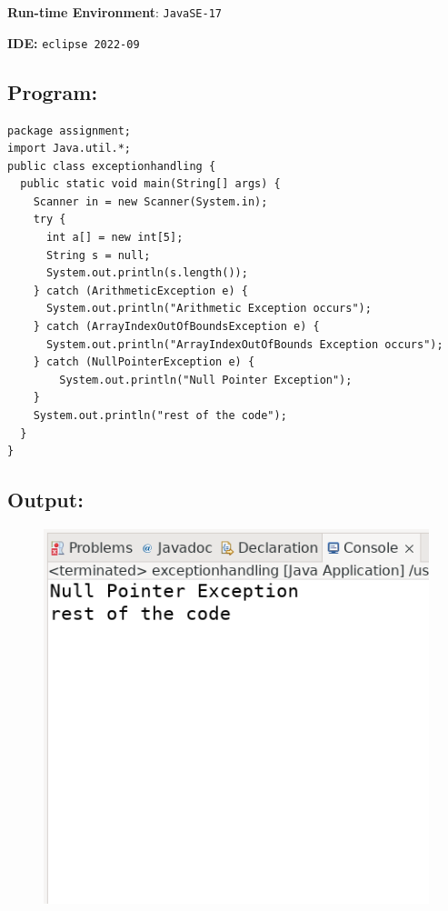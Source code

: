 \documentclass[12pt, a4paper]{article}
\begin{document}
\textbf{Run-time Environment}: \verb+JavaSE-17+

\textbf{IDE:} \verb+eclipse 2022-09+

\subsection*{Program:}
\begin{lstlisting}
package assignment;
import Java.util.*;
public class exceptionhandling {
  public static void main(String[] args) {
    Scanner in = new Scanner(System.in);
    try {
      int a[] = new int[5];
      String s = null;
      System.out.println(s.length());
    } catch (ArithmeticException e) {
      System.out.println("Arithmetic Exception occurs");
    } catch (ArrayIndexOutOfBoundsException e) {
      System.out.println("ArrayIndexOutOfBounds Exception occurs");
    } catch (NullPointerException e) {
        System.out.println("Null Pointer Exception");
    }
    System.out.println("rest of the code");
  }
}
\end{lstlisting}

\subsection*{Output:}
\begin{figure}[h]
  \centering
  \includegraphics[width=\textwidth]{exceptionhandling}
\end{figure}
\newpage
\end{document}
